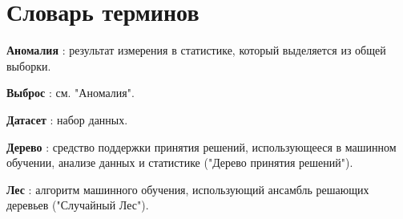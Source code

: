 \chapter*{Словарь терминов}             %

\textbf{Аномалия} : результат измерения в статистике, который выделяется из общей выборки.

\textbf{Выброс} : см. "Аномалия".

\textbf{Датасет} : набор данных.

\textbf{Дерево} : средство поддержки принятия решений, использующееся в машинном обучении, анализе данных и статистике ("Дерево принятия решений").

\textbf{Лес} : алгоритм машинного обучения, использующий ансамбль решающих деревьев ("Случайный Лес").